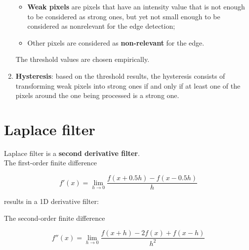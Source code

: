 \documentclass{article}
\begin{document}
\begin{enumerate}[start=0]
\begin{itemize}
        \item \textbf{Weak pixels} are pixels that have an intensity value that is not enough to be considered as strong ones, but yet not small enough to be considered as nonrelevant for the edge detection;
        \item Other pixels are considered as \textbf{non-relevant} for the edge.
    \end{itemize}
    The threshold values are chosen empirically.
    \item \textbf{Hysteresis}: based on the threshold results, the hysteresis consists of transforming weak pixels into strong ones if and only if at least one of the pixels around the one being processed is a strong one.
    
\end{enumerate}

\newpage

\section*{Laplace filter}

Laplace filter is a \textbf{second derivative filter}. \\

The first-order finite difference

\begin{center}
    \begin{equation*}
        f'(x) = \lim_{h\to 0} \frac{f(x + 0.5h) - f(x - 0.5h)}{h}
    \end{equation*}
\end{center}

results in a 1D derivative filter:

\begin{center}
\end{center}

\vspace{0.5cm}

The second-order finite difference

\begin{center}
    \begin{equation*}
        f''(x) = \lim_{h\to 0} \frac{f(x + h) - 2f(x) + f(x - h)}{h^2}
    \end{equation*}
\end{center}
\end{document}
